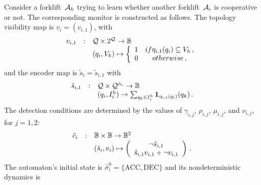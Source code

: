 \documentclass[journal, onecolumn, 12pt]{styles/IEEEtran}
\begin{document}
Consider a forklift~$\mathcal{A}_h$ trying to learn whether another forklift~$\mathcal{A}_i$ is cooperative or not. The corresponding monitor is constructed as follows. The topology visibility map is $v_i=(v_{i,1})$, with
\begin{equation*}
\begin{array}{rcl}
v_{i,1} & : & \mathcal{Q} \times 2^{\mathcal{Q}} \rightarrow \Bbb{B} \\
& & (q_i, V_h) \mapsto
\left\lbrace
\begin{array}{cc}
1 & \relax{ if } \eta_{i,1}(q_i) \subseteq V_h \, , \\
0 & \relax{ otherwise} \, ,
\end{array}
\right.
\end{array}
\end{equation*}
and the encoder map is $\tilde{s}_i = \tilde{s}_{i,1}$ with 
\begin{equation*}
\begin{array}{rcl}
\tilde{s}_{i,1} & : & \mathcal{Q} \times \mathcal{Q}^{\hat{n}_i} \rightarrow \Bbb{B} \\
& & (q_i, I_i^h) \rightarrow \sum_{q_k \in I_i^h} {\bf 1}_{\eta_{i,1}(q_i)}(q_k) \, .
\end{array}
\end{equation*}
The detection conditions are determined by the values of $\gamma_{i,j}$, $\rho_{i,j}$, $\mu_{i,j}$, and $\nu_{i,j}$, for $j=1,2$:
\begin{equation*}
\begin{array}{rcl}
\tilde{c}_i & : & \Bbb{B} \times \Bbb{B} \rightarrow \Bbb{B}^2 \\
& & (\hat{s}_i, v_i) \mapsto
\left(
\begin{array}{c}
\neg \hat{s}_{i,1} \\ 
\hat{s}_{i,1} v_{i,1} + \neg v_{i,1} 
\end{array}
\right)
\, .
\end{array}
\end{equation*}
The automaton's initial state is  $\hat{\sigma}_i^0 = \{\mbox{ACC}, \mbox{DEC}\}$ and its nondeterministic dynamics is
\end{document}

